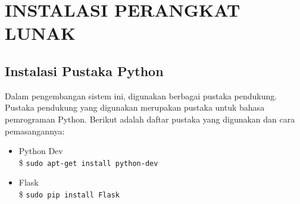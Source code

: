 \chapter{INSTALASI PERANGKAT LUNAK}

\section*{Instalasi Pustaka Python} \label{install:pythonlibrary}
	Dalam pengembangan sistem ini, digunakan berbagai pustaka pendukung. Pustaka pendukung yang digunakan merupakan pustaka untuk bahasa pemrograman Python. Berikut adalah daftar pustaka yang digunakan dan cara pemasangannya:
    \begin{itemize}
    \item Python Dev \\
    	\$ \texttt{sudo apt-get install python-dev}
    \item Flask \\
    	\$ \texttt{sudo pip install Flask}
    
    \end{itemize}



